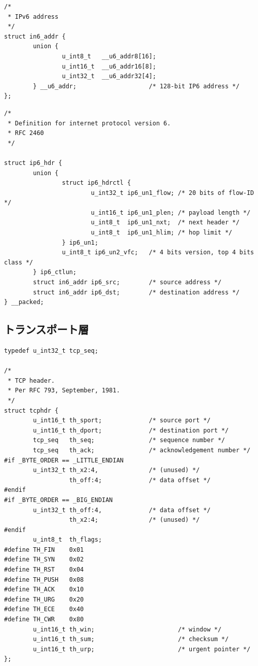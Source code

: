 \begin{lstlisting}[caption=IPv6アドレス構造体 (/usr/include/netinet6/in6.h),label=src:in6.h]
/*
 * IPv6 address
 */
struct in6_addr {
        union {
                u_int8_t   __u6_addr8[16];
                u_int16_t  __u6_addr16[8];
                u_int32_t  __u6_addr32[4];
        } __u6_addr;                    /* 128-bit IP6 address */
};
\end{lstlisting}

\begin{lstlisting}[caption=IPv6ヘッダ定義 (/usr/include/netinet/ip6.h),label=src:ip6.h]
/*
 * Definition for internet protocol version 6.
 * RFC 2460
 */

struct ip6_hdr {
        union {
                struct ip6_hdrctl {
                        u_int32_t ip6_un1_flow; /* 20 bits of flow-ID */
                        u_int16_t ip6_un1_plen; /* payload length */
                        u_int8_t  ip6_un1_nxt;  /* next header */
                        u_int8_t  ip6_un1_hlim; /* hop limit */
                } ip6_un1;
                u_int8_t ip6_un2_vfc;   /* 4 bits version, top 4 bits class */
        } ip6_ctlun;
        struct in6_addr ip6_src;        /* source address */
        struct in6_addr ip6_dst;        /* destination address */
} __packed;
\end{lstlisting}

\subsection{トランスポート層} \label{sec:transport}

\begin{lstlisting}[caption=TCPヘッダ定義 (/usr/include/netinet/tcp.h),label=src:tcp.h]
typedef u_int32_t tcp_seq;

/*
 * TCP header.
 * Per RFC 793, September, 1981.
 */
struct tcphdr {
        u_int16_t th_sport;             /* source port */
        u_int16_t th_dport;             /* destination port */
        tcp_seq   th_seq;               /* sequence number */
        tcp_seq   th_ack;               /* acknowledgement number */
#if _BYTE_ORDER == _LITTLE_ENDIAN
        u_int32_t th_x2:4,              /* (unused) */
                  th_off:4;             /* data offset */
#endif
#if _BYTE_ORDER == _BIG_ENDIAN
        u_int32_t th_off:4,             /* data offset */
                  th_x2:4;              /* (unused) */
#endif
        u_int8_t  th_flags;
#define TH_FIN    0x01
#define TH_SYN    0x02
#define TH_RST    0x04
#define TH_PUSH   0x08
#define TH_ACK    0x10
#define TH_URG    0x20
#define TH_ECE    0x40
#define TH_CWR    0x80
        u_int16_t th_win;                       /* window */
        u_int16_t th_sum;                       /* checksum */
        u_int16_t th_urp;                       /* urgent pointer */
};
\end{lstlisting}

